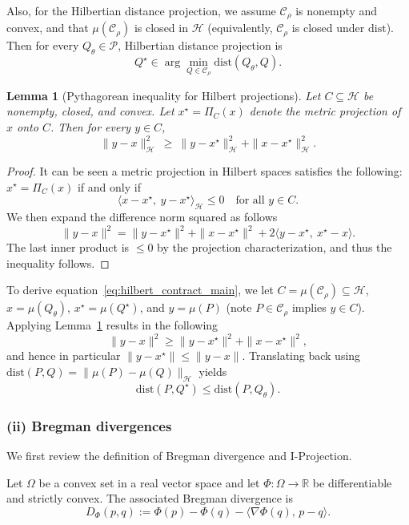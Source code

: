 \documentclass{article}
\newtheorem{lemma}{Lemma}
\theoremstyle{plain}
\theoremstyle{definition}
\def\eqref#1{equation~\ref{#1}}
\begin{document}
\begin{appendices}
Also, for the Hilbertian distance projection, we assume $\mathcal{C}_\rho$ is nonempty and convex, and that $\mu(\mathcal{C}_\rho)$ is closed in
$\mathcal{H}$ (equivalently, $\mathcal{C}_\rho$ is closed under $\mathrm{dist}$).
Then for every $Q_\theta\in\mathcal{P}$, Hilbertian distance projection is
\[
Q^\star\in\arg\min_{Q\in\mathcal{C}_\rho}\mathrm{dist}(Q_\theta,Q).
\]

\begin{lemma}[Pythagorean inequality for Hilbert projections]
\label{lem:hilbert_pythag}
Let $C\subseteq\mathcal{H}$ be nonempty, closed, and convex.
Let $x^\star=\Pi_C(x)$ denote the metric projection of $x$ onto $C$.
Then for every $y\in C$,
\[
\|y-x\|_{\mathcal{H}}^2\ \ge\ \|y-x^\star\|_{\mathcal{H}}^2+\|x-x^\star\|_{\mathcal{H}}^2.
\]
\end{lemma}

\begin{proof}
It can be seen a metric projection in Hilbert spaces satisfies the following:
$x^\star=\Pi_C(x)$ if and only if
\[
\langle x-x^\star,\ y-x^\star\rangle_{\mathcal{H}}\le 0\quad\text{for all }y\in C.
\]
We then expand the difference norm squared as follows
\[
\|y-x\|^2
=\|y-x^\star\|^2+\|x-x^\star\|^2+2\langle y-x^\star,\ x^\star-x\rangle.
\]
The last inner product is $\le 0$ by the projection characterization, and thus the inequality follows.
\end{proof}

To derive \eqref{eq:hilbert_contract_main}, we let $C=\mu(\mathcal{C}_\rho)\subseteq\mathcal{H}$, $x=\mu(Q_\theta)$,
$x^\star=\mu(Q^\star)$, and $y=\mu(P)$ (note $P\in\mathcal{C}_\rho$ implies $y\in C$).
Applying Lemma~\ref{lem:hilbert_pythag} results in the following
\[
\|y-x\|^2\ge \|y-x^\star\|^2+\|x-x^\star\|^2,
\]
and hence in particular $\|y-x^\star\|\le \|y-x\|$.
Translating back using $\mathrm{dist}(P,Q)=\|\mu(P)-\mu(Q)\|_{\mathcal{H}}$ yields
\[
\mathrm{dist}(P,Q^\star)\le \mathrm{dist}(P,Q_\theta).
\]

\subsubsection*{(ii) Bregman divergences}
We first review the definition of Bregman divergence and I-Projection.

Let $\Omega$ be a convex set in a real vector space and let $\Phi:\Omega\to\mathbb{R}$ be differentiable
and strictly convex.
The associated Bregman divergence is
\[
D_\Phi(p,q):=\Phi(p)-\Phi(q)-\langle \nabla\Phi(q),\,p-q\rangle.
\]


\end{appendices}
\end{document}
